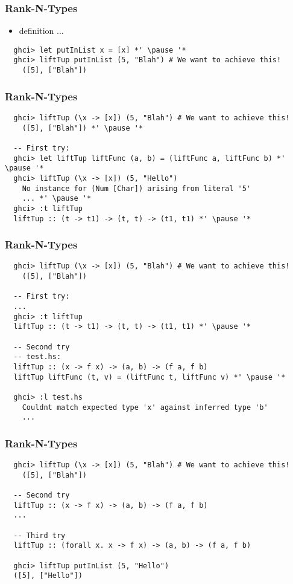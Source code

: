 \documentclass[aspectratio=43]{beamer}
\begin{document}
\begin{frame}[fragile]
 \frametitle{Rank-N-Types}
 \begin{itemize}
  \item definition ...
 \end{itemize}
 \pause
 \begin{lstlisting}
  ghci> let putInList x = [x] *' \pause '*
  ghci> liftTup putInList (5, "Blah") # We want to achieve this!
    ([5], ["Blah"])
 \end{lstlisting}
\end{frame}

\begin{frame}[fragile]
 \frametitle{Rank-N-Types}
 \begin{lstlisting}
  ghci> liftTup (\x -> [x]) (5, "Blah") # We want to achieve this!
    ([5], ["Blah"]) *' \pause '*
  
  -- First try:
  ghci> let liftTup liftFunc (a, b) = (liftFunc a, liftFunc b) *' \pause '*
  ghci> liftTup (\x -> [x]) (5, "Hello")
    No instance for (Num [Char]) arising from literal '5'
    ... *' \pause '*
  ghci> :t liftTup
  liftTup :: (t -> t1) -> (t, t) -> (t1, t1) *' \pause '*
 \end{lstlisting}
\end{frame}

\begin{frame}[fragile]
 \frametitle{Rank-N-Types}
 \begin{lstlisting}
  ghci> liftTup (\x -> [x]) (5, "Blah") # We want to achieve this!
    ([5], ["Blah"])
  
  -- First try:
  ...
  ghci> :t liftTup
  liftTup :: (t -> t1) -> (t, t) -> (t1, t1) *' \pause '*
  
  -- Second try
  -- test.hs:
  liftTup :: (x -> f x) -> (a, b) -> (f a, f b)
  liftTup liftFunc (t, v) = (liftFunc t, liftFunc v) *' \pause '*
  
  ghci> :l test.hs
    Couldnt match expected type 'x' against inferred type 'b' 
    ...
 \end{lstlisting}
\end{frame}

\begin{frame}[fragile]
 \frametitle{Rank-N-Types}
 \begin{lstlisting}
  ghci> liftTup (\x -> [x]) (5, "Blah") # We want to achieve this!
    ([5], ["Blah"])
    
  -- Second try
  liftTup :: (x -> f x) -> (a, b) -> (f a, f b)
  ...
  
  -- Third try
  liftTup :: (forall x. x -> f x) -> (a, b) -> (f a, f b)
  
  ghci> liftTup putInList (5, "Hello")
  ([5], ["Hello"])
 \end{lstlisting} 
\end{frame}
\end{document}
